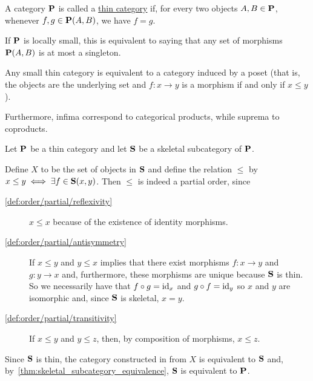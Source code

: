 \begin{definition}\label{def:thin_category}\cite{nLab:thin_category}
  A category $\operatorname{\mathbf{P}}$ is called a \uline{thin category} if, for every two objects $A, B \in \operatorname{\mathbf{P}}$, whenever $f, g \in \operatorname{\mathbf{P}}(A, B)$, we have $f = g$.

  If $\operatorname{\mathbf{P}}$ is locally small, this is equivalent to saying that any set of morphisms $\operatorname{\mathbf{P}}(A, B)$ is at most a singleton.
\end{definition}

\begin{proposition}\label{thm:small_thin_category_equivalent_to_poset}
  Any small thin category is equivalent to a category induced by a poset (that is, the objects are the underlying set and $f: x \to y$ is a morphism if and only if $x \leq y$).

  Furthermore, infima correspond to categorical products, while suprema to coproducts.
\end{proposition}

\begin{definition}
  Let $\operatorname{\mathbf{P}}$ be a thin category and let $\operatorname{\mathbf{S}}$ be a skeletal subcategory of $\operatorname{\mathbf{P}}$.

  Define $X$ to be the set of objects in $\operatorname{\mathbf{S}}$ and define the relation $\leq$ by $x \leq y \iff \exists f \in \operatorname{\mathbf{S}}(x, y)$. Then $\leq$ is indeed a partial order, since
  \begin{description}
    \item[\ref{def:order/partial/reflexivity}] $x \leq x$ because of the existence of identity morphisms.
    \item[\ref{def:order/partial/antisymmetry}] If $x \leq y$ and $y \leq x$ implies that there exist morphisms $f: x \to y$ and $g: y \to x$ and, furthermore, these morphisms are unique because $\operatorname{\mathbf{S}}$ is thin. So we necessarily have that $f \circ g = \operatorname{id}_x$ and $g \circ f = \operatorname{id}_y$ so $x$ and $y$ are isomorphic and, since $\operatorname{\mathbf{S}}$ is skeletal, $x = y$.
    \item[\ref{def:order/partial/transitivity}] If $x \leq y$ and $y \leq z$, then, by composition of morphisms, $x \leq z$.
  \end{description}

  Since $\operatorname{\mathbf{S}}$ is thin, the category constructed in from $X$ is equivalent to $\operatorname{\mathbf{S}}$ and, by~\cref{thm:skeletal_subcategory_equivalence}, $\operatorname{\mathbf{S}}$ is equivalent to $\operatorname{\mathbf{P}}$.
\end{definition}

